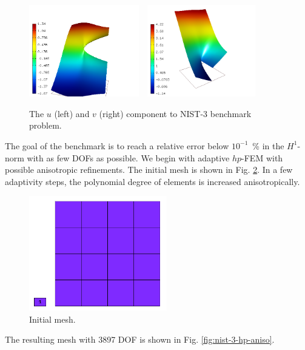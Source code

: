 \begin{figure}[!ht]
\centering
\includegraphics[height=40mm]{nist/nist-3/solution-u.png}\ \
\includegraphics[height=40mm]{nist/nist-3/solution-v.png}
\vspace{-2mm}
\caption{The $u$ (left) and $v$ (right) component to NIST-3 benchmark problem.}
\label{fig:sln-nist03}
\end{figure}

The goal of the benchmark is to reach a relative error below
$10^{-1}$~\% in the $H^1$-norm with as few DOFs as possible.
We begin with adaptive $hp$-FEM with possible anisotropic refinements.
The initial mesh is shown in Fig. \ref{fig:nist-3-hp-aniso-init}.
In a few adaptivity steps, the polynomial degree of elements is increased
anisotropically.

\begin{figure}[!ht]
\centering
\includegraphics[height=5cm]{nist/nist-3/mesh_hp_aniso_init.png}
\caption{Initial mesh.}
\label{fig:nist-3-hp-aniso-init}
\end{figure}

The resulting mesh with 3897 DOF is shown in Fig. \ref{fig:nist-3-hp-aniso}.

